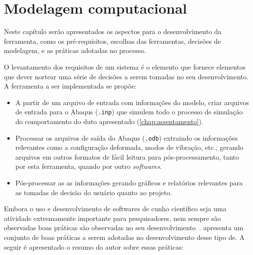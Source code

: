 \chapter{Modelagem computacional}

Neste capítulo serão apresentados os aspectos para o desenvolvimento da ferramenta, como os pré-requisitos, escolhas das ferramentas, decisões de modelagem, e as práticas adotadas no processo.

O levantamento dos requisitos de um sistema é o elemento que fornece elementos que dever nortear uma série de decisões a serem tomadas no seu desenvolvimento.
A ferramenta a ser implementada se propõe:
\begin{itemize}
    \item A partir de um arquivo de entrada com informações do modelo, criar arquivos de entrada para o Abaqus (\texttt{.inp}) que simulem todo o processo de simulação do comportamento do duto apresentado (\autoref{chap:assentamento}).
    \item Processar os arquivos de saída do Abaqus (\texttt{.odb}) extraindo os informações relevantes como a configuração deformada, modos de vibração, etc., gerando arquivos em outros formatos de fácil leitura para pós-processamento, tanto por esta ferramenta, quando por outro \textit{softwares}.
    \item Pós-processar as as informações gerando gráficos e relatórios relevantes para as tomadas de decisão do usuário quanto ao projeto.
\end{itemize}


Embora o uso e desenvolvimento de softwares de cunho científico seja uma atividade extremamente importante para pesquisadores, nem sempre são observadas boas práticas são observadas no seu desenvolvimento~\cite{Hannay2009}.
 apresenta um conjunto de boas práticas a serem adotadas no desenvolvimento desse tipo de. A seguir é apresentado o resumo do autor sobre essas práticas:

